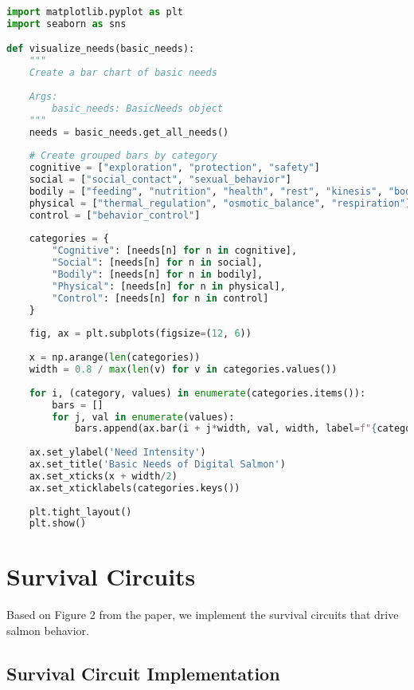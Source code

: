 \documentclass[11pt,a4paper]{article}
\begin{document}
\begin{lstlisting}[language=Python]
import matplotlib.pyplot as plt
import seaborn as sns

def visualize_needs(basic_needs):
    """
    Create a bar chart of basic needs
    
    Args:
        basic_needs: BasicNeeds object
    """
    needs = basic_needs.get_all_needs()
    
    # Create grouped bars by category
    cognitive = ["exploration", "protection", "safety"]
    social = ["social_contact", "sexual_behavior"]
    bodily = ["feeding", "nutrition", "health", "rest", "kinesis", "body_care"]
    physical = ["thermal_regulation", "osmotic_balance", "respiration"]
    control = ["behavior_control"]
    
    categories = {
        "Cognitive": [needs[n] for n in cognitive],
        "Social": [needs[n] for n in social],
        "Bodily": [needs[n] for n in bodily],
        "Physical": [needs[n] for n in physical],
        "Control": [needs[n] for n in control]
    }
    
    fig, ax = plt.subplots(figsize=(12, 6))
    
    x = np.arange(len(categories))
    width = 0.8 / max(len(v) for v in categories.values())
    
    for i, (category, values) in enumerate(categories.items()):
        bars = []
        for j, val in enumerate(values):
            bars.append(ax.bar(i + j*width, val, width, label=f"{category} {j+1}"))
    
    ax.set_ylabel('Need Intensity')
    ax.set_title('Basic Needs of Digital Salmon')
    ax.set_xticks(x + width/2)
    ax.set_xticklabels(categories.keys())
    
    plt.tight_layout()
    plt.show()
\end{lstlisting}

\section{Survival Circuits}
Based on Figure 2 from the paper, we implement the survival circuits that drive salmon behavior.

\subsection{Survival Circuit Implementation}
\end{document}
